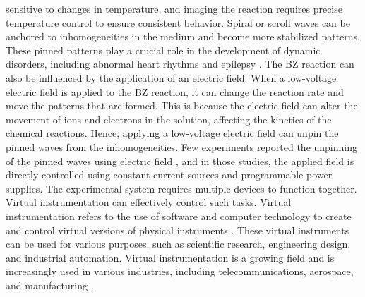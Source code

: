 \documentclass[journal=jacsat,manuscript=article]{achemso}
\begin{document}
sensitive to changes in temperature, and imaging the reaction requires
precise temperature control to ensure consistent behavior. 
Spiral or scroll waves can be anchored to inhomogeneities in the
medium and become more stabilized patterns. These pinned patterns play
a crucial role in the development of dynamic disorders, including
abnormal heart rhythms \cite{bruser2012automatic}
\cite{kundu2021amplitude} and epilepsy \cite{punacha2020theory}. The
BZ reaction can also be influenced by the application of an electric
field. When a low-voltage electric field is applied to the BZ
reaction, it can change the reaction rate and move the patterns that
are formed. This is because the electric field can alter the movement
of ions and electrons in the solution, affecting the kinetics of the
chemical reactions. Hence, applying a low-voltage electric field can
unpin the pinned waves from the inhomogeneities. Few experiments
reported the unpinning of the pinned waves using electric field
\cite{steinbock1992electric}\cite{ji2013experimental}\cite{jimenez2013electric}\cite{sutthiopad2014unpinning}\cite{porjai2016electrically},
and in those studies, the applied field is directly controlled using
constant current sources and programmable power supplies. The
experimental system requires multiple devices to function together.
Virtual instrumentation can effectively control such tasks. Virtual
instrumentation refers to the use of software and computer technology
to create and control virtual versions of physical instruments \cite{singh2008implementation}. 
These virtual instruments can be used for various purposes, such as scientific research, engineering design, and industrial automation. Virtual instrumentation is a growing field and is increasingly used in various industries, including telecommunications, aerospace, and manufacturing \cite{}.
\end{document}
